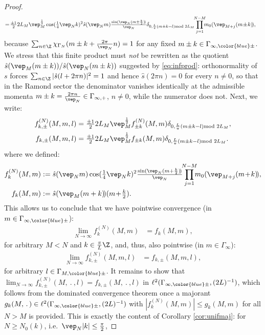 \documentclass[a4paper, 11pt]{article}
\newcommand{\ltwo}{\ell^{2}}
\DeclareMathOperator{\1}{\mathds{1}}
\begin{document}
\begin{proof}
\begin{align*}
&\!=\!\tfrac{\pm1}{2}2L_{M}\vep_{M}^{\frac{1}{2}} \cos(\tfrac{1}{4}\vep_{N}k)^{2}\hat{s}(\vep_{N}m)\tfrac{\sin(\vep_{N}(m\pm\frac{k}{2})\!)}{\vep_{N}} \delta_{0,\frac{L}{\pi}(m\pm k-l)\!\!\!\!\mod 2L_{M}}\!\!\prod_{j=1}^{N-M}\!\!\!m_{0}(\vep_{M+j}(m\!\pm\!k)\!),
\end{align*}
because $\sum_{n\in\Z}\chi_{\Gamma_{N}}(m\pm k+\tfrac{2\pi}{\vep_{N}}n) = 1$ for any fixed $m\pm k\in\Gamma_{\infty,{\color{blue}\pm}}$. We stress that this finite product must \emph{not} be rewritten as the quotient $\hat{s}(\vep_{M}(m\pm k))/\hat{s}(\vep_{N}(m\pm k))$ suggested by \eqref{eq:infprod}: orthonormality of $s$ forces $\sum_{n\in\Z}|\hat{s}(l+2\pi n)|^{2}=1$ and hence $\hat{s}(2\pi n)=0$ for every $n\neq0$, so that in the Ramond sector the denominator vanishes identically at the admissible momenta $m\pm k = \tfrac{2\pi n}{\vep_{N}}\in\Gamma_{\infty,+}$, $n\neq0$, while the numerator does not. Next, we write:
\begin{align*}
f^{(N)}_{k,\pm}(M,m,l) & = \tfrac{\pm1}{2}2L_{M}\vep_{M}^{\frac{1}{2}}f^{(N)}_{\pm k}(M,m)\delta_{0,\frac{L}{\pi}(m\pm k-l)\!\!\!\!\mod 2L_{M}}, \\
f_{k,\pm}(M,m,l) & =  \tfrac{\pm1}{2}2L_{M}\vep_{M}^{\frac{1}{2}}f_{\pm k}(M,m)\delta_{0,\frac{L}{\pi}(m\pm k-l)\!\!\!\!\mod 2L_{M}}.
\end{align*}
where we defined:
\begin{align*}
f^{(N)}_{k}(M,m) & := \hat{s}(\vep_{N}m)\cos(\tfrac{1}{4}\vep_{N}k)^{2}\tfrac{\sin(\vep_{N}(m+\frac{k}{2})\!)}{\vep_{N}}\!\!\prod_{j=1}^{N-M}\!\!\!m_{0}(\vep_{M+j}(m\!+\!k)\!), \\
f_{k}(M,m) & := \hat{s}(\vep_{M}(m+k)\!)(m\!+\!\tfrac{k}{2}).
\end{align*}
This allows us to conclude that we have pointwise convergence (in $m\in\Gamma_{\infty,{\color{blue}\pm}}$):
\begin{align*}
\lim_{N\rightarrow\infty}f^{(N)}_{k}(M,m) & = f_{k}(M,m),
\end{align*}
for arbitrary $M<N$ and $k\in\tfrac{\pi}{L}\Z$, and, thus, also pointwise (in $m\in\Gamma_{\infty}$):
\begin{align*}
\lim_{N\rightarrow\infty}f^{(N)}_{k,\pm}(M,m,l) & = f_{k,\pm}(M,m,l),
\end{align*}
for arbitrary $l\in\Gamma_{M,{\color{blue}\pm}}$. It remains to show that $\lim_{N\rightarrow\infty}f^{(N)}_{k,\pm}(M,\!\ .\!\ ,l) = f_{k,\pm}(M,\!\ .\!\ ,l)$ in $\ltwo(\Gamma_{\infty,{\color{blue}\pm}},(2L)^{-1})$, which follows from the dominated convergence theorem once a majorant $g_{k}(M,\!\ .\!\ )\in\ltwo(\Gamma_{\infty,{\color{blue}\pm}},(2L)^{-1})$ with $|f^{(N)}_{k}(M,m)|\leq g_{k}(M,m)$ for all $N>M$ is provided. This is exactly the content of Corollary \ref{cor:unifmaj}: for $N\geq N_{0}(k)$, i.e.~$\vep_{N}|k|\leq\tfrac{\pi}{2}$,

\end{proof}
\end{document}
